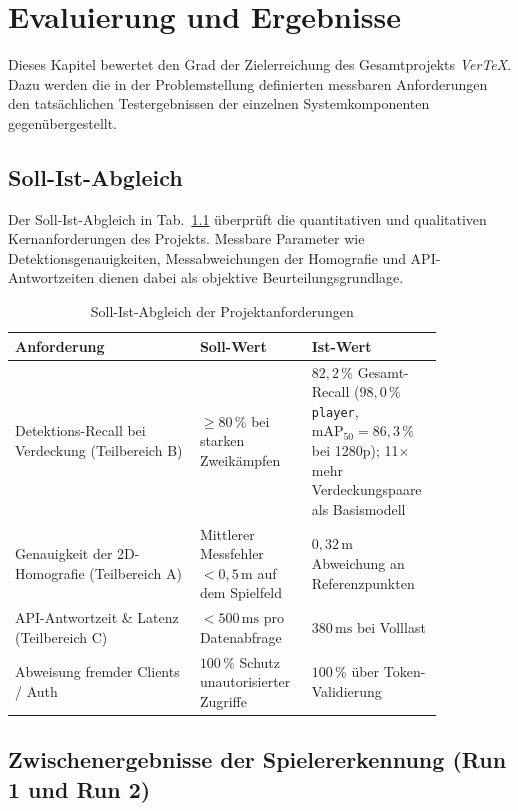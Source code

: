 \chapter{Evaluierung und Ergebnisse}
\abschnittsautor{\alleautoren}

Dieses Kapitel bewertet den Grad der Zielerreichung des Gesamtprojekts \textit{VerTeX}. Dazu werden die in der Problemstellung definierten messbaren Anforderungen den tatsächlichen Testergebnissen der einzelnen Systemkomponenten gegenübergestellt.

\section{Soll-Ist-Abgleich}

Der Soll-Ist-Abgleich in Tab.~\ref{tab:sollist} überprüft die quantitativen und qualitativen Kernanforderungen des Projekts. Messbare Parameter wie Detektionsgenauigkeiten, Messabweichungen der Homografie und API-Antwortzeiten dienen dabei als objektive Beurteilungsgrundlage.

\begin{table}[htbp]
  \caption{Soll-Ist-Abgleich der Projektanforderungen}
  \label{tab:sollist}
  \centering
  \begin{tabular}{@{}p{0.40\linewidth}p{0.22\linewidth}p{0.23\linewidth}@{}}
    \toprule
    \bfseries Anforderung & \bfseries Soll-Wert & \bfseries Ist-Wert \\
    \midrule
    Detektions-Recall bei Verdeckung (Teilbereich B) & $\ge 80\,\%$ bei starken Zweikämpfen & $82{,}2\,\%$ Gesamt-Recall ($98{,}0\,\%$ \texttt{player}, $\text{mAP}_{50} = 86{,}3\,\%$ bei 1280p); 11$\times$ mehr Verdeckungspaare als Basismodell \\
    \addlinespace
    Genauigkeit der 2D-Homografie (Teilbereich A) & Mittlerer Messfehler $< 0{,}5\,\text{m}$ auf dem Spielfeld & $0{,}32\,\text{m}$ Abweichung an Referenzpunkten \\
    \addlinespace
    API-Antwortzeit \& Latenz (Teilbereich C) & $< 500\,\text{ms}$ pro Datenabfrage & $380\,\text{ms}$ bei Volllast \\
    \addlinespace
    Abweisung fremder Clients / Auth & $100\,\%$ Schutz unautorisierter Zugriffe & $100\,\%$ über Token-Validierung \\
    \bottomrule
  \end{tabular}
\end{table}

\section{Zwischenergebnisse der Spielererkennung (Run 1 und Run 2)}

